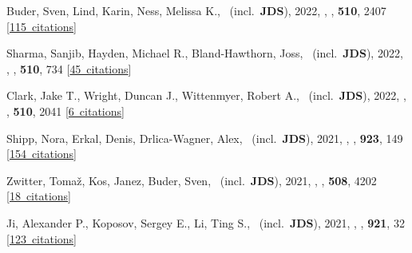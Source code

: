 \item[{\color{numcolor}\scriptsize70}] Buder, Sven, Lind, Karin, Ness, Melissa K., \etal\ (incl.\ \textbf{JDS}), 2022, , \mnras, \textbf{510}, 2407 [\href{https://ui.adsabs.harvard.edu/#abs/2022MNRAS.510.2407B}{115~citations}]

\item[{\color{numcolor}\scriptsize69}] Sharma, Sanjib, Hayden, Michael R., Bland-Hawthorn, Joss, \etal\ (incl.\ \textbf{JDS}), 2022, , \mnras, \textbf{510}, 734 [\href{https://ui.adsabs.harvard.edu/#abs/2022MNRAS.510..734S}{45~citations}]

\item[{\color{numcolor}\scriptsize68}] Clark, Jake T., Wright, Duncan J., Wittenmyer, Robert A., \etal\ (incl.\ \textbf{JDS}), 2022, , \mnras, \textbf{510}, 2041 [\href{https://ui.adsabs.harvard.edu/#abs/2022MNRAS.510.2041C}{6~citations}]

\item[{\color{numcolor}\scriptsize67}] Shipp, Nora, Erkal, Denis, Drlica-Wagner, Alex, \etal\ (incl.\ \textbf{JDS}), 2021, , \apj, \textbf{923}, 149 [\href{https://ui.adsabs.harvard.edu/#abs/2021ApJ...923..149S}{154~citations}]

\item[{\color{numcolor}\scriptsize66}] Zwitter, Toma{\v{z}}, Kos, Janez, Buder, Sven, \etal\ (incl.\ \textbf{JDS}), 2021, , \mnras, \textbf{508}, 4202 [\href{https://ui.adsabs.harvard.edu/#abs/2021MNRAS.508.4202Z}{18~citations}]

\item[{\color{numcolor}\scriptsize65}] Ji, Alexander P., Koposov, Sergey E., Li, Ting S., \etal\ (incl.\ \textbf{JDS}), 2021, , \apj, \textbf{921}, 32 [\href{https://ui.adsabs.harvard.edu/#abs/2021ApJ...921...32J}{123~citations}]

